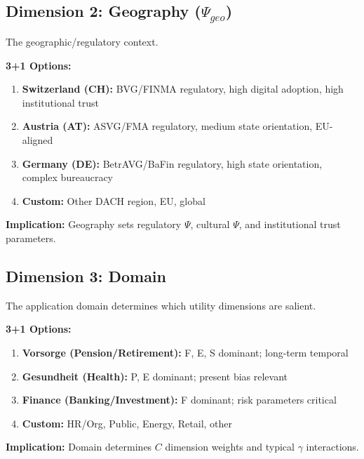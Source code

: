 \subsection{Dimension 2: Geography ($\Psi_{geo}$)}

The geographic/regulatory context.

\begin{tcolorbox}[colback=white, colframe=black,
    title=Dimension 2: Geography Selection]
\textbf{3+1 Options:}
\begin{enumerate}
\item[$\square$] \textbf{Switzerland (CH):} BVG/FINMA regulatory, high digital adoption, high institutional trust
\item[$\square$] \textbf{Austria (AT):} ASVG/FMA regulatory, medium state orientation, EU-aligned
\item[$\square$] \textbf{Germany (DE):} BetrAVG/BaFin regulatory, high state orientation, complex bureaucracy
\item[$\square$] \textbf{Custom:} Other DACH region, EU, global
\end{enumerate}

\textbf{Implication:} Geography sets regulatory $\Psi$, cultural $\Psi$, and
institutional trust parameters.
\end{tcolorbox}

\subsection{Dimension 3: Domain}

The application domain determines which utility dimensions are salient.

\begin{tcolorbox}[colback=white, colframe=black,
    title=Dimension 3: Domain Selection]
\textbf{3+1 Options:}
\begin{enumerate}
\item[$\square$] \textbf{Vorsorge (Pension/Retirement):} F, E, S dominant; long-term temporal
\item[$\square$] \textbf{Gesundheit (Health):} P, E dominant; present bias relevant
\item[$\square$] \textbf{Finance (Banking/Investment):} F dominant; risk parameters critical
\item[$\square$] \textbf{Custom:} HR/Org, Public, Energy, Retail, other
\end{enumerate}

\textbf{Implication:} Domain determines $C$ dimension weights and typical $\gamma$ interactions.
\end{tcolorbox}

